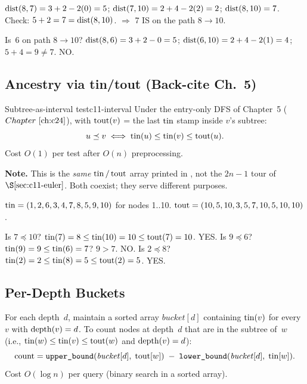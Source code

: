 \begin{tracebox}
\(\operatorname{dist}(8,7) = 3+2-2(0) = 5\); \(\operatorname{dist}(7,10) = 2+4-2(2) = 2\);
\(\operatorname{dist}(8,10) = 7\).  Check: \(5+2 = 7 = \operatorname{dist}(8,10)\).
\(\Rightarrow\) 7 IS on the path \(8\to10\).  \checkmark

Is~6 on path \(8\to10\)?  \(\operatorname{dist}(8,6)=3+2-0=5\);
\(\operatorname{dist}(6,10)=2+4-2(1)=4\); \(5+4=9\ne 7\).  NO.  \checkmark
\end{tracebox}

\subsection{Ancestry via tin/tout (Back-cite Ch.~5)}

\begin{proposition}{Subtree-as-interval test}{c11-interval}
Under the entry-only DFS of Chapter~5 (\(\chref{c24}\)), with
\(\operatorname{tout}(v)\) = the last \(\operatorname{tin}\) stamp inside \(v\)'s subtree:
\[
  u \preceq v \iff \operatorname{tin}(u) \le \operatorname{tin}(v) \le \operatorname{tout}(u).
\]
Cost \(O(1)\) per test after \(O(n)\) preprocessing.
\end{proposition}

\noindent\textbf{Note.}  This is the \emph{same} \(\operatorname{tin}/\operatorname{tout}\) array
printed in , not the \(2n\!-\!1\) tour of
\(\secref{c11-euler}\).  Both coexist; they serve different purposes.

\begin{tracebox}
\(\operatorname{tin} = (1,2,6,3,4,7,8,5,9,10)\) for nodes 1..10.
\(\operatorname{tout} = (10,5,10,3,5,7,10,5,10,10)\).

Is \(7 \preceq 10\)?  \(\operatorname{tin}(7)=8 \le \operatorname{tin}(10)=10 \le \operatorname{tout}(7)=10\).  YES.  \checkmark
Is \(9 \preceq 6\)?  \(\operatorname{tin}(9)=9 \le \operatorname{tin}(6)=7\)?  \(9 > 7\).  NO.  \checkmark
Is \(2 \preceq 8\)?  \(\operatorname{tin}(2)=2 \le \operatorname{tin}(8)=5 \le \operatorname{tout}(2)=5\).  YES.  \checkmark
\end{tracebox}

\subsection{Per-Depth Buckets}

For each depth~\(d\), maintain a sorted array \(\mathit{bucket}[d]\)
containing \(\operatorname{tin}(v)\) for every \(v\) with \(\operatorname{depth}(v) = d\).  To count
nodes at depth~\(d\) that are in the subtree of~\(w\) (i.e.,
\(\operatorname{tin}(w) \le \operatorname{tin}(v) \le \operatorname{tout}(w)\) and \(\operatorname{depth}(v)=d\)):
\[
  \text{count} = \texttt{upper\_bound}(\mathit{bucket}[d],\;\operatorname{tout}[w])
  \;-\; \texttt{lower\_bound}(\mathit{bucket}[d],\;\operatorname{tin}[w]).
\]
Cost \(O(\log n)\) per query (binary search in a sorted array).

